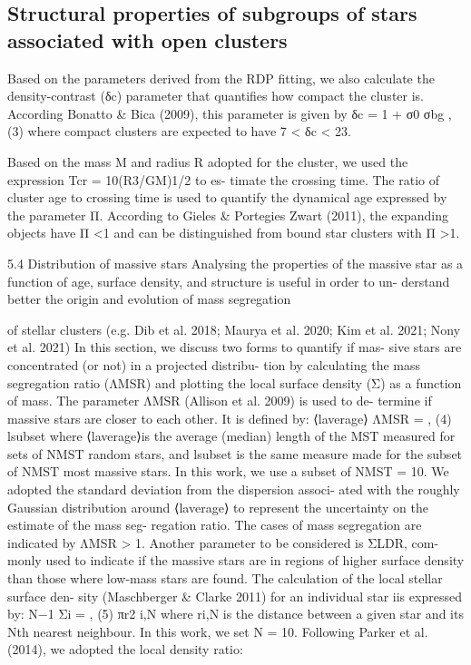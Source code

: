 \documentclass[../Main.tex]{subfiles}
\begin{document}
{\subsection{Structural properties of subgroups of stars associated with open clusters}

Based on the parameters derived from the RDP fitting,
we also calculate the density-contrast (δc) parameter that
quantifies how compact the cluster is. According Bonatto &
Bica (2009), this parameter is given by
δc = 1 + σ0
σbg
, (3)
where compact clusters are expected to have 7 < δc < 23.

Based on the mass M and radius R adopted for the
cluster, we used the expression Tcr = 10(R3/GM)1/2 to es-
timate the crossing time. The ratio of cluster age to crossing
time is used to quantify the dynamical age expressed by the
parameter Π. According to Gieles & Portegies Zwart (2011),
the expanding objects have Π <1 and can be distinguished
from bound star clusters with Π >1.

5.4 Distribution of massive stars
Analysing the properties of the massive star as a function of
age, surface density, and structure is useful in order to un-
derstand better the origin and evolution of mass segregation

of stellar clusters (e.g. Dib et al. 2018; Maurya et al. 2020;
Kim et al. 2021; Nony et al. 2021)
In this section, we discuss two forms to quantify if mas-
sive stars are concentrated (or not) in a projected distribu-
tion by calculating the mass segregation ratio (ΛMSR) and
plotting the local surface density (Σ) as a function of mass.
The parameter ΛMSR (Allison et al. 2009) is used to de-
termine if massive stars are closer to each other. It is defined
by:
⟨laverage⟩
ΛMSR =
, (4)
lsubset
where ⟨laverage⟩is the average (median) length of the MST
measured for sets of NMST random stars, and lsubset is the
same measure made for the subset of NMST most massive
stars. In this work, we use a subset of NMST = 10. We
adopted the standard deviation from the dispersion associ-
ated with the roughly Gaussian distribution around ⟨laverage⟩
to represent the uncertainty on the estimate of the mass seg-
regation ratio. The cases of mass segregation are indicated
by ΛMSR > 1.
Another parameter to be considered is ΣLDR, com-
monly used to indicate if the massive stars are in regions
of higher surface density than those where low-mass stars
are found. The calculation of the local stellar surface den-
sity (Maschberger & Clarke 2011) for an individual star iis
expressed by:
N−1
Σi =
, (5)
πr2
i,N
where ri,N is the distance between a given star and its Nth
nearest neighbour. In this work, we set N = 10. Following
Parker et al. (2014), we adopted the local density ratio:

}
\end{document}
